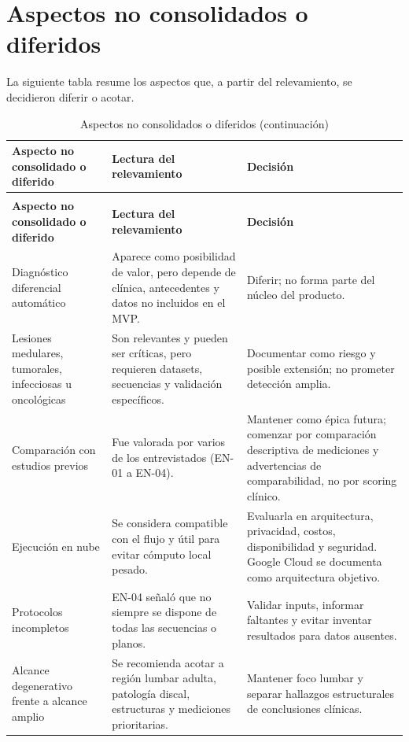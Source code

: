 \section{Aspectos no consolidados o diferidos}

La siguiente tabla resume los aspectos que, a partir del relevamiento, se decidieron diferir o acotar.

{\small
\setlength{\LTleft}{0pt}
\setlength{\LTright}{0pt}
\renewcommand{\arraystretch}{1.18}
\setlength{\tabcolsep}{3pt}
\begin{longtable}{>{\raggedright\arraybackslash}p{} >{\raggedright\arraybackslash}p{} >{\raggedright\arraybackslash}p{}}
\caption{Aspectos no consolidados o diferidos}\label{tab:user-research-diferidos}\\
\hline
\textbf{Aspecto no consolidado o diferido} & \textbf{Lectura del relevamiento} & \textbf{Decisión} \\
\hline
\endfirsthead
\caption[]{Aspectos no consolidados o diferidos (continuación)}\\
\hline
\textbf{Aspecto no consolidado o diferido} & \textbf{Lectura del relevamiento} & \textbf{Decisión} \\
\hline
\endhead
\hline
\endfoot
Diagnóstico diferencial automático & Aparece como posibilidad de valor, pero depende de clínica, antecedentes y datos no incluidos en el MVP. & Diferir; no forma parte del núcleo del producto. \\
Lesiones medulares, tumorales, infecciosas u oncológicas & Son relevantes y pueden ser críticas, pero requieren datasets, secuencias y validación específicos. & Documentar como riesgo y posible extensión; no prometer detección amplia. \\
Comparación con estudios previos & Fue valorada por varios de los entrevistados (EN-01 a EN-04). & Mantener como épica futura; comenzar por comparación descriptiva de mediciones y advertencias de comparabilidad, no por scoring clínico. \\
Ejecución en nube & Se considera compatible con el flujo y útil para evitar cómputo local pesado. & Evaluarla en arquitectura, privacidad, costos, disponibilidad y seguridad. Google Cloud se documenta como arquitectura objetivo. \\
Protocolos incompletos & EN-04 señaló que no siempre se dispone de todas las secuencias o planos. & Validar inputs, informar faltantes y evitar inventar resultados para datos ausentes. \\
Alcance degenerativo frente a alcance amplio & Se recomienda acotar a región lumbar adulta, patología discal, estructuras y mediciones prioritarias. & Mantener foco lumbar y separar hallazgos estructurales de conclusiones clínicas. \\

\end{longtable}}
